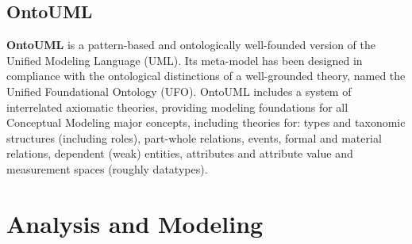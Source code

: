 \documentclass[12pt,a4paper,titlepage]{article}
\begin{document}
\subsection{OntoUML}
\textbf{OntoUML} is a pattern-based and ontologically well-founded version of the Unified Modeling Language (UML). Its meta-model has been designed in compliance with the ontological distinctions of a well-grounded theory, named the Unified Foundational Ontology (UFO). OntoUML includes a system of interrelated axiomatic theories, providing modeling foundations for all Conceptual Modeling major concepts, including theories for: types and taxonomic structures (including roles), part-whole relations, events, formal and material relations, dependent (weak) entities, attributes and attribute value and measurement spaces (roughly datatypes). \par


\section{Analysis and Modeling}
\end{document}
